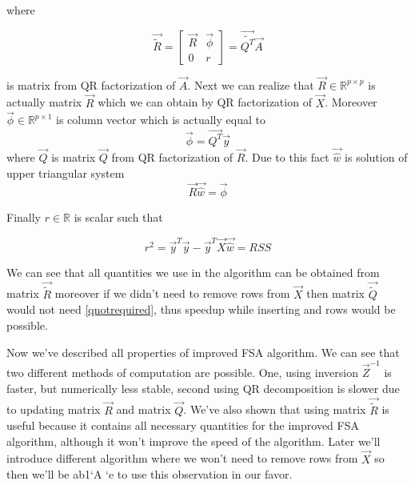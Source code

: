 where 

\begin{equation}
	\vec{\tilde{R}} = 
	\begin{bmatrix}
		\vec{R} & \vec{\phi} \\
     0 & r
	\end{bmatrix} 
	= \vec{\tilde{Q^T}}\vec{A}
\end{equation}

is matrix from QR factorization of $\vec{A}$. 
Next we can realize that $\vec{R} \in \mathbb{R}^{p \times p}$ is actually matrix $\vec{R}$ which we can obtain by QR factorization of $\vec{X}$. 
Moreover $\vec{\phi} \in \mathbb{R}^{p \times 1}$ is column vector which is actually equal to
\begin{equation}
	\vec{\phi} =  \vec{Q^T}\vec{y}
\end{equation}
where $\vec{Q}$ is matrix $\vec{Q}$ from QR factorization of $\vec{R}$.
Due to this fact $\vec{\hat{w}}$ is solution of upper triangular system 
\begin{equation}
	\vec{R}\vec{\hat{w}} = \vec{\phi}
\end{equation}

Finally $r \in \mathbb{R}$ is scalar such that 

\begin{equation}
	r^2 = \vec{y}^T\vec{y} - \vec{y}^T\vec{X}\vec{\hat{w}} = RSS
\end{equation}

\begin{remark} \label{qnotrequiredspeedupremark}
	We can see that all quantities we use in the algorithm can be obtained from matrix $\vec{\tilde{R}}$ moreover if we didn't need to remove rows from $\vec{X}$ then matrix $\vec{\tilde{Q}}$ would not need \ref{qnotrequired}, thus speedup while inserting and rows would be possible. 
\end{remark}

Now we've described all properties of improved FSA algorithm. We can see that two different methods of computation are possible. One, using inversion $\vec{Z}^{-1}$ is faster, but numerically less stable, second using QR decomposition is slower due to updating matrix $\vec{R}$ and matrix $\vec{Q}$. We've also shown that using matrix $\vec{\tilde{R}}$ is useful because it contains all necessary quantities for the improved FSA algorithm, although it won't improve the speed of the algorithm. Later we'll introduce different algorithm where we won't need to remove rows from $\vec{X}$ so then we'll be ab1`A																		`e to use this observation in our favor.


